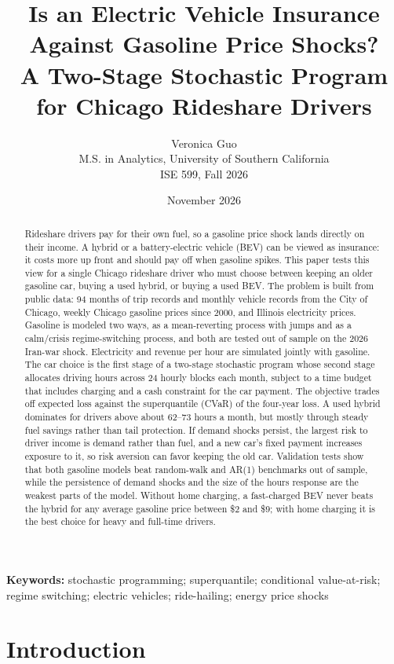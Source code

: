 \documentclass[11pt]{article}
\title{Is an Electric Vehicle Insurance Against Gasoline Price Shocks?\\
\large A Two-Stage Stochastic Program for Chicago Rideshare Drivers}
\author{Veronica Guo\\
\small M.S. in Analytics, University of Southern California\\
\small ISE 599, Fall 2026}
\date{November 2026}
\begin{document}
\maketitle

\begin{abstract}
\noindent
Rideshare drivers pay for their own fuel, so a gasoline price shock lands directly on their income. A hybrid or a battery-electric vehicle (BEV) can be viewed as insurance: it costs more up front and should pay off when gasoline spikes. This paper tests this view for a single Chicago rideshare driver who must choose between keeping an older gasoline car, buying a used hybrid, or buying a used BEV. The problem is built from public data: 94 months of trip records and monthly vehicle records from the City of Chicago, weekly Chicago gasoline prices since 2000, and Illinois electricity prices. Gasoline is modeled two ways, as a mean-reverting process with jumps and as a calm/crisis regime-switching process, and both are tested out of sample on the 2026 Iran-war shock. Electricity and revenue per hour are simulated jointly with gasoline. The car choice is the first stage of a two-stage stochastic program whose second stage allocates driving hours across 24 hourly blocks each month, subject to a time budget that includes charging and a cash constraint for the car payment. The objective trades off expected loss against the superquantile (CVaR) of the four-year loss. A used hybrid dominates for drivers above about 62--73 hours a month, but mostly through steady fuel savings rather than tail protection. If demand shocks persist, the largest risk to driver income is demand rather than fuel, and a new car's fixed payment increases exposure to it, so risk aversion can favor keeping the old car. Validation tests show that both gasoline models beat random-walk and AR(1) benchmarks out of sample, while the persistence of demand shocks and the size of the hours response are the weakest parts of the model. Without home charging, a fast-charged BEV never beats the hybrid for any average gasoline price between \$2 and \$9; with home charging it is the best choice for heavy and full-time drivers.
\end{abstract}

\noindent\textbf{Keywords:} stochastic programming; superquantile; conditional value-at-risk; regime switching; electric vehicles; ride-hailing; energy price shocks

\section{Introduction}
\end{document}
